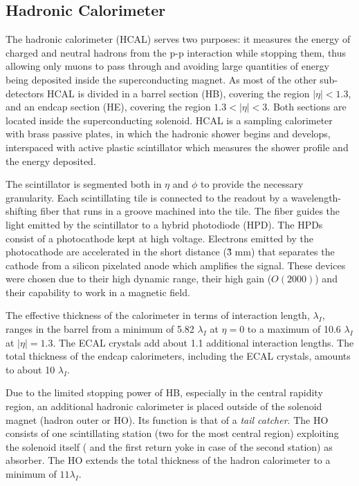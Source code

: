 \subsection{Hadronic Calorimeter}

The hadronic calorimeter (HCAL) serves two purposes: it measures the energy of charged and neutral hadrons from the p-p interaction while stopping them, thus allowing only muons to pass through and avoiding large quantities of energy being deposited inside the superconducting magnet. As most of the other sub-detectors HCAL is divided in a barrel section (HB), covering the region $|\eta| < 1.3$, and an endcap section (HE), covering the region $1.3 < |\eta| < 3$. Both sections are located inside the superconducting solenoid. HCAL is a sampling calorimeter with brass passive plates, in which the hadronic shower begins and develops, interspaced with active plastic scintillator which measures the shower profile and the energy deposited. 

The scintillator is segmented both in $\eta$ and $\phi$ to provide the necessary granularity. Each scintillating tile is connected to the readout by a wavelength-shifting fiber that runs in a groove machined into the tile. The fiber guides the light emitted by the scintillator to a hybrid photodiode (HPD). The HPDs consist of a photocathode kept at high voltage. Electrons emitted by the photocathode are accelerated in the short distance (\~3 mm) that separates the cathode from a silicon pixelated anode which amplifies the signal. These devices were chosen due to their high dynamic range, their high gain ($O(2000)$) and their capability to work in a magnetic field.

The effective thickness of the calorimeter in terms of interaction length, $\lambda_I$, ranges in the barrel from a minimum of 5.82 $\lambda_I$ at $\eta=0$ to a maximum of 10.6 $\lambda_I$ at $|\eta| = 1.3$. The ECAL crystals add about 1.1 additional interaction lengths. The total thickness of the endcap calorimeters, including the ECAL crystals, amounts to about 10 $\lambda_I$.

Due to the limited stopping power of HB, especially in the central rapidity region, an additional hadronic calorimeter is placed outside of the solenoid magnet (hadron outer or HO). Its function is that of a \emph{tail catcher}. The HO consists of one scintillating station (two for the most central region) exploiting the solenoid itself ( and the first return yoke in case of the second station) as absorber. The HO extends the total thickness of the hadron calorimeter to a minimum of $11 \lambda_I$.

